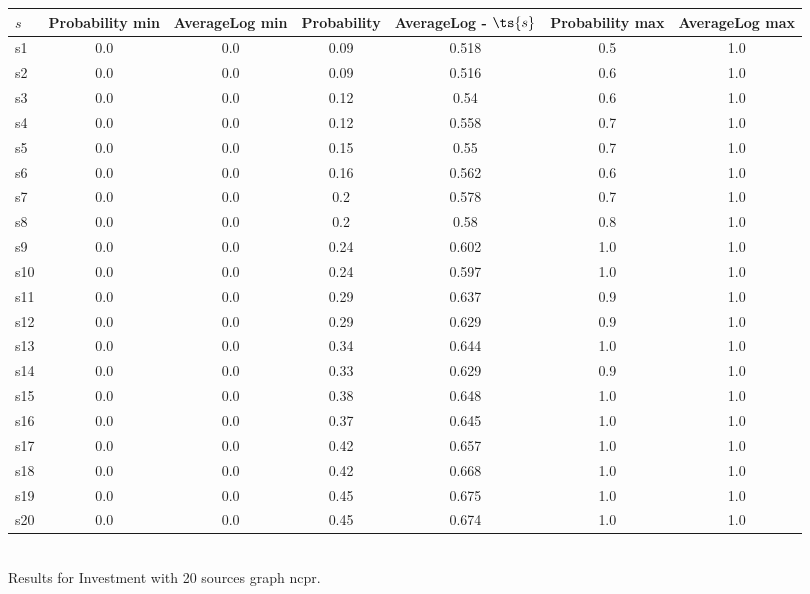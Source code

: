 \documentclass{article}
\begin{document}
\noindent\begin{tabular}{|l|c|c|c|c|c|c|}
\hline
$s$& Probability min & AverageLog min & Probability & AverageLog - $\ts{s}$ & Probability max & AverageLog max\\
\hline
s1 &0.0 & 0.0 & 0.09 & 0.518 & 0.5 & 1.0\\
\hline
s2 &0.0 & 0.0 & 0.09 & 0.516 & 0.6 & 1.0\\
\hline
s3 &0.0 & 0.0 & 0.12 & 0.54 & 0.6 & 1.0\\
\hline
s4 &0.0 & 0.0 & 0.12 & 0.558 & 0.7 & 1.0\\
\hline
s5 &0.0 & 0.0 & 0.15 & 0.55 & 0.7 & 1.0\\
\hline
s6 &0.0 & 0.0 & 0.16 & 0.562 & 0.6 & 1.0\\
\hline
s7 &0.0 & 0.0 & 0.2 & 0.578 & 0.7 & 1.0\\
\hline
s8 &0.0 & 0.0 & 0.2 & 0.58 & 0.8 & 1.0\\
\hline
s9 &0.0 & 0.0 & 0.24 & 0.602 & 1.0 & 1.0\\
\hline
s10 &0.0 & 0.0 & 0.24 & 0.597 & 1.0 & 1.0\\
\hline
s11 &0.0 & 0.0 & 0.29 & 0.637 & 0.9 & 1.0\\
\hline
s12 &0.0 & 0.0 & 0.29 & 0.629 & 0.9 & 1.0\\
\hline
s13 &0.0 & 0.0 & 0.34 & 0.644 & 1.0 & 1.0\\
\hline
s14 &0.0 & 0.0 & 0.33 & 0.629 & 0.9 & 1.0\\
\hline
s15 &0.0 & 0.0 & 0.38 & 0.648 & 1.0 & 1.0\\
\hline
s16 &0.0 & 0.0 & 0.37 & 0.645 & 1.0 & 1.0\\
\hline
s17 &0.0 & 0.0 & 0.42 & 0.657 & 1.0 & 1.0\\
\hline
s18 &0.0 & 0.0 & 0.42 & 0.668 & 1.0 & 1.0\\
\hline
s19 &0.0 & 0.0 & 0.45 & 0.675 & 1.0 & 1.0\\
\hline
s20 &0.0 & 0.0 & 0.45 & 0.674 & 1.0 & 1.0\\
\hline
\end{tabular}\\

\noindent Results for Investment with 20 sources graph ncpr.
\end{document}
